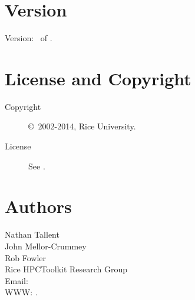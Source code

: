 \documentclass[english]{article}
\begin{document}
\section{Version}

Version: \Version\ of \Date.

\section{License and Copyright}

\begin{description}
\item[Copyright] \copyright\ 2002-2014, Rice University.
\item[License] See .
\end{description}

\section{Authors}

\noindent
Nathan Tallent \\
John Mellor-Crummey \\
Rob Fowler \\
Rice HPCToolkit Research Group \\
Email:  \\
WWW: .

\LatexManEnd
\end{document}
